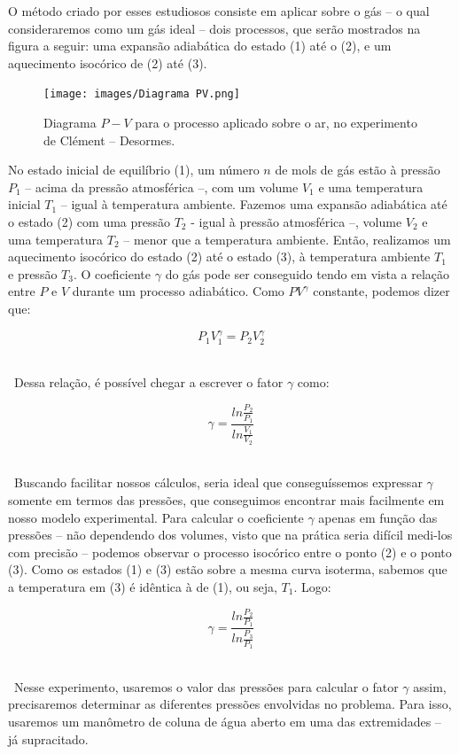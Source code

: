 O método criado por esses estudiosos consiste em aplicar sobre o gás – o qual consideraremos como um gás ideal – dois processos, que serão mostrados na figura a seguir: uma expansão adiabática do estado (1) até o (2), e um aquecimento isocórico de (2) até (3).\\

\begin{figure}[H]
  \centering
  \texttt{[image: images/Diagrama PV.png]}
  \caption{Diagrama $P-V$ para o processo aplicado sobre o ar, no experimento de Clément – Desormes.}
  \label{fig:processo-grafico}
\end{figure}

No estado inicial de equilíbrio (1), um número $n$ de mols de gás estão à pressão $P_1$ – acima da pressão atmosférica –, com um volume $V_1$ e uma temperatura inicial $T_1$ – igual à temperatura ambiente. Fazemos uma expansão adiabática até o estado (2) com uma pressão $T_2$ - igual à pressão atmosférica –, volume $V_2$ e uma temperatura $T_2$ – menor que a temperatura ambiente. Então, realizamos um aquecimento isocórico do estado (2) até o estado (3), à temperatura ambiente $T_1$ e pressão $T_3$.
O coeficiente $\gamma$ do gás pode ser conseguido tendo em vista a relação entre $P$ e $V$ durante um processo adiabático. Como $PV^\gamma$ constante, podemos dizer que:

\[ P_1V_1^\gamma =  P_2V_2^\gamma\]\

\ Dessa relação, é possível chegar a escrever o fator $\gamma$ como:

\[ \gamma = \frac{ln\frac{P_2}{P_1}}{ln\frac{V_1}{V_2}}\]\

\ Buscando facilitar nossos cálculos, seria ideal que conseguíssemos expressar $\gamma$ somente em termos das pressões, que conseguimos encontrar mais facilmente em nosso modelo experimental. Para calcular o coeficiente $\gamma$ apenas em função das pressões – não dependendo dos volumes, visto que na prática seria difícil medi-los com precisão – podemos observar o processo isocórico entre o ponto (2) e o ponto (3). Como os estados (1) e (3) estão sobre a mesma curva isoterma, sabemos que a temperatura em (3) é idêntica à de (1), ou seja, $T_1$. Logo:

\[ \gamma = \frac{ln\frac{P_2}{P_1}}{ln\frac{P_3}{P_1}}\] \

\ Nesse experimento, usaremos o valor das pressões para calcular o fator $\gamma$ assim, precisaremos determinar as diferentes pressões envolvidas no problema. Para isso, usaremos um manômetro de coluna de água aberto em uma das extremidades – já supracitado.\\

